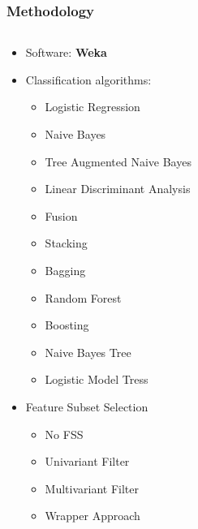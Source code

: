 \documentclass{beamer}
\begin{document}
\begin{frame}
\frametitle{Methodology}
\begin{columns}
\begin{column}{0.5\textwidth}
\begin{itemize}
\item Software: \textbf{Weka}
\item Classification algorithms:
\begin{tiny}
\begin{itemize}
	\scriptsize
	\item Logistic Regression
	\item Naive Bayes
	\item Tree Augmented Naive Bayes
	\item Linear Discriminant Analysis
	\item Fusion
	\item Stacking
	\item Bagging
	\item Random Forest
	\item Boosting
	\item Naive Bayes Tree
	\item Logistic Model Tress
\end{itemize}
\end{tiny}
\item Feature Subset Selection
\begin{itemize}
	\scriptsize
	\item No FSS
	\item Univariant Filter
	\item Multivariant Filter
	\item Wrapper Approach
\end{itemize}
\end{itemize}
\end{column}


\end{columns}
\end{frame}
\end{document}
